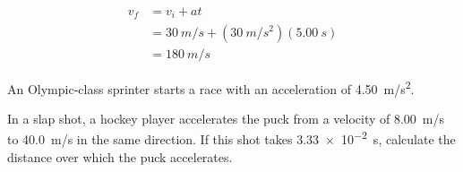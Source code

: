 \documentclass[]{exam}
\theoremstyle{definition}
\begin{document}
\begin{questions}
\begin{parts}
\begin{solution}
    \begin{align*}
        v_f &= v_i + at \\[1ex]
        &= \SI{30}{m/s} + (\SI{30}{m/s^2})(\SI{5.00}{s}) \\[1ex]
        &= \boxed{\SI{180}{m/s}}
    \end{align*}    
\end{solution}
\end{parts}

\question \label{openstax-2.20}
An Olympic-class sprinter starts a race with an acceleration of \SI{4.50}{m/s^2}. 


\question \label{openstax-2.27}
In a slap shot, a hockey player accelerates the puck from a velocity of \SI{8.00}{m/s} to \SI{40.0}{m/s} in the same direction. If this shot takes \SI{3.33e-2}{s}, calculate the distance over which the puck accelerates.


\end{questions}
\end{document}
